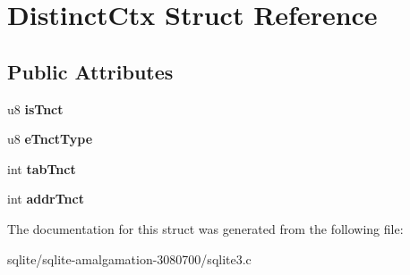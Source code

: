 \hypertarget{struct_distinct_ctx}{\section{Distinct\+Ctx Struct Reference}
\label{struct_distinct_ctx}
}
\subsection*{Public Attributes}
\begin{DoxyCompactItemize}
\item 
\hypertarget{struct_distinct_ctx_aaaa3b23ad86358ba11b4da77cd753bbd}{u8 {\bfseries is\+Tnct}}\label{struct_distinct_ctx_aaaa3b23ad86358ba11b4da77cd753bbd}

\item 
\hypertarget{struct_distinct_ctx_ae57f819b64420f943f21d8d0e9c36205}{u8 {\bfseries e\+Tnct\+Type}}\label{struct_distinct_ctx_ae57f819b64420f943f21d8d0e9c36205}

\item 
\hypertarget{struct_distinct_ctx_af4514e425f99659e97b2bbe756716517}{int {\bfseries tab\+Tnct}}\label{struct_distinct_ctx_af4514e425f99659e97b2bbe756716517}

\item 
\hypertarget{struct_distinct_ctx_a897fdd9a1025f3d6c438a5113cf925d2}{int {\bfseries addr\+Tnct}}\label{struct_distinct_ctx_a897fdd9a1025f3d6c438a5113cf925d2}

\end{DoxyCompactItemize}


The documentation for this struct was generated from the following file\+:\begin{DoxyCompactItemize}
\item 
sqlite/sqlite-\/amalgamation-\/3080700/sqlite3.\+c\end{DoxyCompactItemize}
